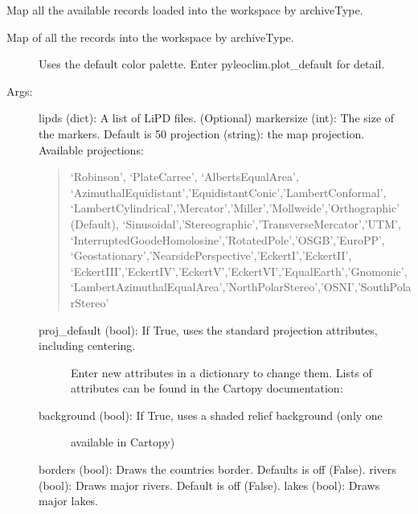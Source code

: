 \documentclass[letterpaper,10pt,english]{sphinxmanual}
\begin{document}
\begin{fulllineitems}
\label{\detokenize{Main:pyleoclim.mapAllArchive}}
Map all the available records loaded into the workspace by archiveType.
\begin{description}
\item[{Map of all the records into the workspace by archiveType.}] \leavevmode
Uses the default color palette. Enter pyleoclim.plot\_default for detail.

\item[{Args:}] \leavevmode
lipds (dict): A list of LiPD files. (Optional)
markersize (int): The size of the markers. Default is 50
projection (string): the map projection. Available projections:
\begin{quote}

‘Robinson’, ‘PlateCarree’, ‘AlbertsEqualArea’,
‘AzimuthalEquidistant’,’EquidistantConic’,’LambertConformal’,
‘LambertCylindrical’,’Mercator’,’Miller’,’Mollweide’,’Orthographic’ (Default),
‘Sinusoidal’,’Stereographic’,’TransverseMercator’,’UTM’,
‘InterruptedGoodeHomolosine’,’RotatedPole’,’OSGB’,’EuroPP’,
‘Geostationary’,’NearsidePerspective’,’EckertI’,’EckertII’,
‘EckertIII’,’EckertIV’,’EckertV’,’EckertVI’,’EqualEarth’,’Gnomonic’,
‘LambertAzimuthalEqualArea’,’NorthPolarStereo’,’OSNI’,’SouthPolarStereo’
\end{quote}
\begin{description}
\item[{proj\_default (bool): If True, uses the standard projection attributes, including centering.}] \leavevmode
Enter new attributes in a dictionary to change them. Lists of attributes
can be found in the Cartopy documentation:
\begin{quote}

\end{quote}

\item[{background (bool): If True, uses a shaded relief background (only one }] \leavevmode
available in Cartopy)

\end{description}

borders (bool): Draws the countries border. Defaults is off (False). 
rivers (bool): Draws major rivers. Default is off (False).
lakes (bool): Draws major lakes.
\begin{quote}


\end{quote}
\end{description}
\end{fulllineitems}
\end{document}
